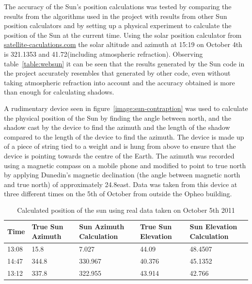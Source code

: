 \documentclass[12pt]{report}
\begin{document}
The accuracy of the Sun's position calculations was tested by comparing the results from the algorithms used in the project with results from other Sun position calculators and by setting up a physical experiment to calculate the position of the Sun at the current time. Using the solar position calculator from \url{satellite-caculations.com}\cite{solarpos} the solar altitude and azimuth at 15:19 on October 4th is 321.1353{\degree} and 41.72{\degree}(including atmospheric refraction). Observing table~\ref{table:websun} it can be seen that the results generated by the Sun code in the project accurately resembles that generated by other code, even without taking atmospheric refraction into account and the accuracy obtained is more than enough for calculating shadows.

A rudimentary device seen in figure~\ref{image:sun-contraption} was used to calculate the physical position of the Sun by finding the angle between north, and the shadow cast by the device to find the azimuth and the length of the shadow compared to the length of the device to find the azimuth. The device is made up of a piece of string tied to a weight and is hung from above to ensure that the device is pointing towards the centre of the Earth. The azimuth was recorded using a magnetic compass on a mobile phone and modified to point to true north by applying Dunedin's magnetic declination (the angle between magnetic north and true north) of approximately 24.8\degree east. Data was taken from this device at three different times on the 5th of October from outside the Opheo building.

\begin{table}
\begin{tabularx}{\textwidth}{ | l | X | X | X | X |}
\hline
Time & True Sun Azimuth & Sun Azimuth Calculation & True Sun Elevation & Sun Elevation Calculation\\ \hline
13:08 & 15.8 & 7.027 & 44.09 & 48.4507 \\ \hline
14:47 & 344.8 & 330.967 & 40.376 & 45.1352\\ \hline
13:12 & 337.8 & 322.955 & 43.914 & 42.766\\ \hline
\end{tabularx}
\caption{Calculated position of the sun using real data taken on October 5th 2011}
\label{realsun}
\end{table}
\end{document}
